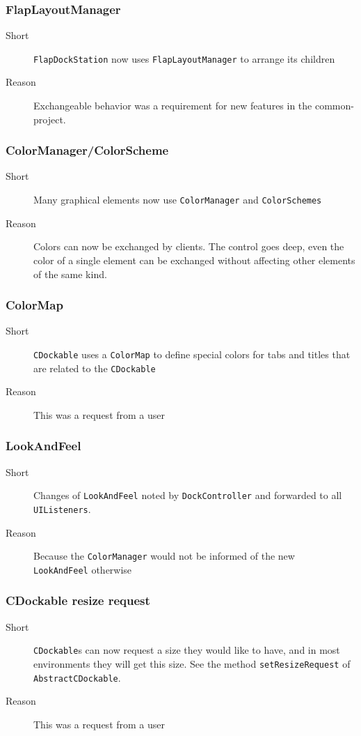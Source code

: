 \documentclass[a4paper,10pt]{article}
\newcommand{\src}[1]{\lstinline[basicstyle=\normalsize\ttfamily,keywordstyle=\normalsize\ttfamily,identifierstyle=\normalsize\ttfamily]|#1|}
\newcommand{\short}{\item[Short]}
\newcommand{\why}{\item[Reason]}
\begin{document}
\subsubsection{FlapLayoutManager}
\begin{description}
 \short \src{FlapDockStation} now uses \src{FlapLayoutManager} to arrange its children
 \why Exchangeable behavior was a requirement for new features in the common-project.
\end{description}

\subsubsection{ColorManager/ColorScheme}
\begin{description}
 \short Many graphical elements now use \src{ColorManager} and \src{ColorSchemes}
 \why Colors can now be exchanged by clients. The control goes deep, even the color of a single element can be exchanged without affecting other elements of the same kind.
\end{description}

\subsubsection{ColorMap}
\begin{description}
 \short \src{CDockable} uses a \src{ColorMap} to define special colors for tabs and titles that are related to the \src{CDockable}
 \why This was a request from a user
\end{description}

\subsubsection{LookAndFeel}
\begin{description}
 \short Changes of \src{LookAndFeel} noted by \src{DockController} and forwarded to all \src{UIListeners}.
 \why Because the \src{ColorManager} would not be informed of the new \\\src{LookAndFeel} otherwise
\end{description}

\subsubsection{CDockable resize request}
\begin{description}
 \short \src{CDockable}s can now request a size they would like to have, and in most environments they will get this size. See the method \src{setResizeRequest} of \src{AbstractCDockable}.
 \why This was a request from a user
\end{description}
\end{document}
